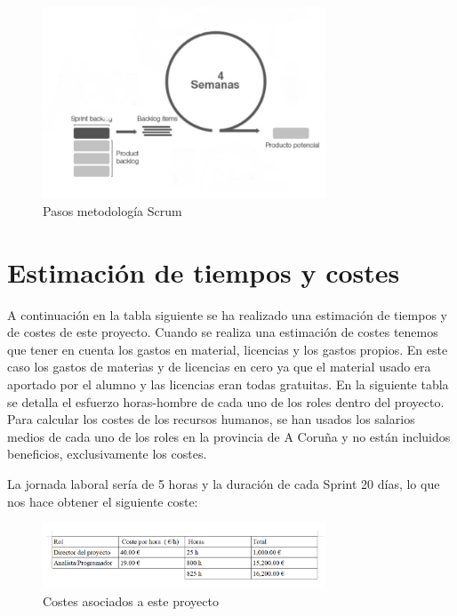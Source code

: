 \begin{figure}[H]
		\centering
		\includegraphics[width=0.75\textwidth] {backlog.png}
		\caption{Pasos metodología Scrum}
	\end{figure} 

\section{Estimación de tiempos y costes}
 A continuación en la tabla siguiente se ha realizado una estimación de tiempos y de costes de este proyecto.
 Cuando se realiza una estimación de costes tenemos que tener en cuenta los gastos en material, licencias y los gastos propios. En este caso los gastos de materias y de licencias en cero ya que el material usado era aportado por el alumno y las licencias eran todas gratuitas.
 En la siguiente tabla se detalla el esfuerzo horas-hombre de cada uno de los roles dentro del proyecto. Para calcular los costes de los recursos humanos, se han usados los salarios medios de cada uno de los roles en la provincia de A Coruña y no están incluidos beneficios, exclusivamente los costes. 
 
 La jornada laboral sería de 5 horas y la duración de cada Sprint 20 días, lo que nos hace obtener el siguiente coste:


\begin{figure}[H]
		\centering
		\includegraphics[width=0.75\textwidth] {coste.png}
		\caption{Costes asociados a este proyecto }
	\end{figure}






